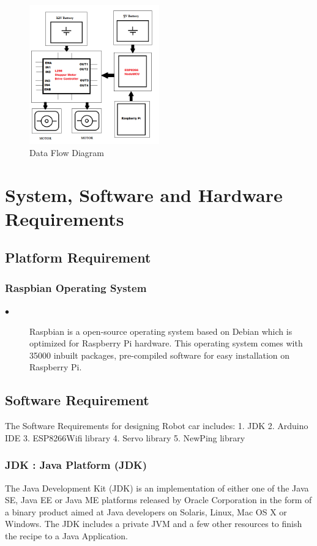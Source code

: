 \documentclass[sigconf]{acmart}
\begin{document}
\begin{figure}[ht!]
  \includegraphics[width=0.5\textwidth]{FlowDiagram.png}
  \caption{Data Flow Diagram}
\end{figure}

\section{System, Software and Hardware Requirements}
\subsection{Platform Requirement}
\subsubsection{Raspbian Operating System}
\begin{description}
\item[$\bullet$] Raspbian is a open-source operating system based on Debian which is optimized for Raspberry Pi hardware. This operating system comes with 35000 inbuilt packages, pre-compiled software for easy installation on Raspberry Pi.
\end{description}

\subsection{Software Requirement}
The Software Requirements for designing Robot car includes:
1. JDK
2. Arduino IDE
3. ESP8266Wifi library
4. Servo library
5. NewPing library

\subsubsection{JDK : Java Platform (JDK)}
The Java Development Kit (JDK) is an implementation
of either one of the Java SE, Java EE or Java ME platforms released by Oracle Corporation in the form of a binary product aimed at Java developers on Solaris, Linux, Mac OS X or Windows. The JDK includes a private JVM and a few other resources to finish the recipe to a Java Application.
\end{document}
